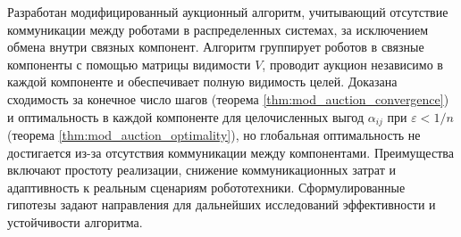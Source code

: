 Разработан модифицированный аукционный алгоритм, учитывающий отсутствие коммуникации между роботами в распределенных системах, за исключением обмена внутри связных компонент. Алгоритм группирует роботов в связные компоненты с помощью матрицы видимости \( V \), проводит аукцион независимо в каждой компоненте и обеспечивает полную видимость целей. Доказана сходимость за конечное число шагов (теорема \ref{thm:mod_auction_convergence}) и оптимальность в каждой компоненте для целочисленных выгод \( \alpha_{ij} \) при \( \varepsilon < 1/n \) (теорема \ref{thm:mod_auction_optimality}), но глобальная оптимальность не достигается из-за отсутствия коммуникации между компонентами. Преимущества включают простоту реализации, снижение коммуникационных затрат и адаптивность к реальным сценариям робототехники. Сформулированные гипотезы задают направления для дальнейших исследований эффективности и устойчивости алгоритма.
